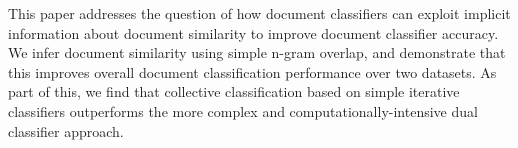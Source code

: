 This paper addresses the question of how document classifiers can exploit implicit information about document similarity to improve document classifier accuracy. We infer document similarity using simple n-gram overlap, and demonstrate that this improves overall document classification performance over two datasets. As part of this, we find that collective classification based on simple iterative classifiers outperforms the more complex and computationally-intensive dual classifier approach.
